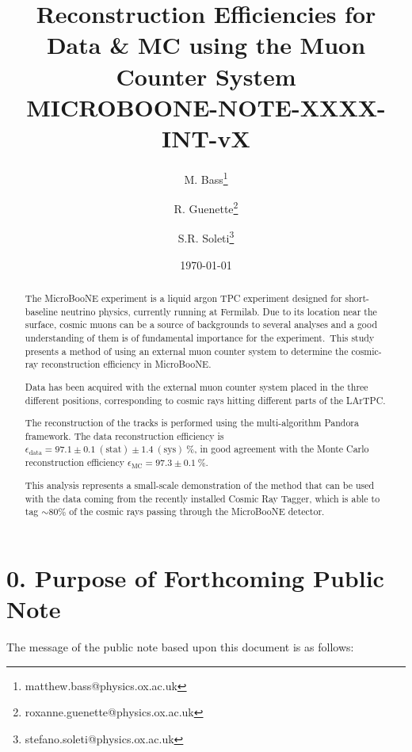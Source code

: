 \documentclass[a4paper]{scrartcl}
\title{Reconstruction Efficiencies for Data \& MC using the Muon Counter System \\ \vspace{1em} \small{\textbf{MICROBOONE-NOTE-XXXX-INT-vX}}}
\author[1]{M. Bass\thanks{matthew.bass@physics.ox.ac.uk}}
\author[1]{R. Guenette\thanks{roxanne.guenette@physics.ox.ac.uk}}
\author[1]{S.R. Soleti\thanks{stefano.soleti@physics.ox.ac.uk}}
\affil[1]{\emph{\small{University of Oxford, Oxford OX1 3RH, United Kingdom}}}
\date{\today}
\begin{document}
\maketitle
\begin{abstract}
  The MicroBooNE experiment is a liquid argon TPC experiment designed for short-baseline neutrino physics, currently running at Fermilab. Due to its location near the surface, cosmic muons can be a source of backgrounds to several analyses and a good understanding of them is of fundamental importance for the experiment. This study presents a method of using an external muon counter system to determine the cosmic-ray reconstruction efficiency in MicroBooNE.

  Data has been acquired with the external muon counter system placed in the three different positions, corresponding to cosmic rays hitting different parts of the LArTPC.

  The reconstruction of the tracks is performed using the multi-algorithm Pandora framework. The data reconstruction efficiency is $\epsilon_{\mathrm{data}}=97.1\pm0.1~(\mathrm{stat}) \pm 1.4~(\mathrm{sys})~\%$, in good agreement with the Monte Carlo reconstruction efficiency $\epsilon_{\mathrm{MC}} = 97.3\pm0.1~\%$.


  This analysis represents a small-scale demonstration of the method that can be used with the data coming from the recently installed Cosmic Ray Tagger, which is able to tag $\sim80\%$ of the cosmic rays passing through the MicroBooNE detector.
\end{abstract}

\tableofcontents

\clearpage{}

\section*{0. Purpose of Forthcoming Public Note}

The message of the public note based upon this document is as follows:
\end{document}
